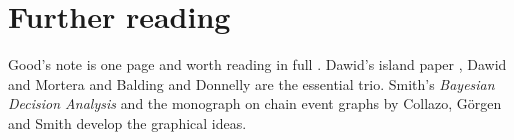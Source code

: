 \section*{Further reading}
Good's note is one page and worth reading in full \citep{good1995}. Dawid's island paper \citep{dawid1994}, Dawid and Mortera \citep{dawid1996} and Balding and Donnelly \citep{balding1995} are the essential trio. Smith's \emph{Bayesian Decision Analysis} \citep{smith2010} and the monograph on chain event graphs by Collazo, G\"orgen and Smith \citep{collazo2018} develop the graphical ideas.
